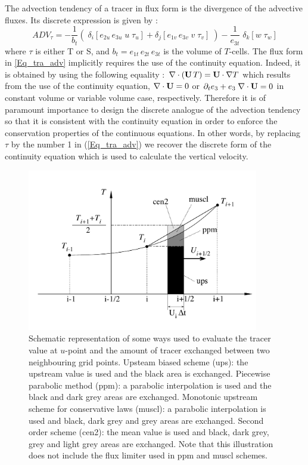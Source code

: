 The advection tendency of a tracer in flux form is the divergence of the advective 
fluxes. Its discrete expression is given by :
\begin{equation} \label{Eq_tra_adv}
ADV_\tau =-\frac{1}{b_t} \left( 
\;\delta _i \left[ e_{2u}\,e_{3u} \;  u\; \tau _u  \right]
+\delta _j \left[ e_{1v}\,e_{3v}  \;  v\; \tau _v  \right] \; \right)
-\frac{1}{e_{3t}} \;\delta _k \left[ w\; \tau _w \right]
\end{equation}
where $\tau$ is either T or S, and $b_t= e_{1t}\,e_{2t}\,e_{3t}$ is the volume of $T$-cells. 
The flux form in \eqref{Eq_tra_adv} 
implicitly requires the use of the continuity equation. Indeed, it is obtained
by using the following equality : $\nabla \cdot \left( \mathbf{U}\,T \right)=\mathbf{U} \cdot \nabla T$ 
which results from the use of the continuity equation, $\nabla \cdot \mathbf{U}=0$ or 
$ \partial _t e_3 + e_3\;\nabla \cdot \mathbf{U}=0$ in constant volume or variable volume case, respectively. 
Therefore it is of paramount importance to design the discrete analogue of the 
advection tendency so that it is consistent with the continuity equation in order to 
enforce the conservation properties of the continuous equations. In other words, 
by replacing $\tau$ by the number 1 in (\ref{Eq_tra_adv}) we recover the discrete form of 
the continuity equation which is used to calculate the vertical velocity.
\begin{figure}[!t] 	 \begin{center}
\includegraphics[width=0.9\textwidth]{./TexFiles/Figures/Fig_adv_scheme.pdf}
\caption{	\label{Fig_adv_scheme} 
Schematic representation of some ways used to evaluate the tracer value 
at $u$-point and the amount of tracer exchanged between two neighbouring grid 
points. Upsteam biased scheme (ups): the upstream value is used and the black 
area is exchanged. Piecewise parabolic method (ppm): a parabolic interpolation 
is used and the black and dark grey areas are exchanged. Monotonic upstream 
scheme for conservative laws (muscl):  a parabolic interpolation is used and black, 
dark grey and grey areas are exchanged. Second order scheme (cen2): the mean 
value is used and black, dark grey, grey and light grey areas are exchanged. Note 
that this illustration does not include the flux limiter used in ppm and muscl schemes.}
\end{center}   \end{figure}


